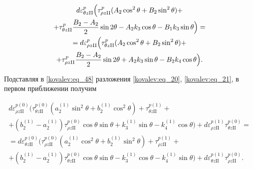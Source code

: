  \begin{multline}

\label{kovalev:eq_48}

 d\varepsilon_{\theta z\mathrm{II}}^p

 \Bigl(\tau_{\rho z\mathrm{II}}^p (A_2\cos^2\theta+B_2\sin^2\theta )+ \\

 +\tau_{\theta z\mathrm{II}}^p\frac{B_2-A_2}{2}\sin2\theta-A_2k_3\cos\theta-B_1k_3\sin\theta\Bigr)=\\

=d\varepsilon_{\rho z\mathrm{II}}^p \Bigl(\tau_{\theta z\mathrm{II}}^p (A_2\cos^2\theta+B_2\sin^2\theta)+\\

 +\tau_{\rho z\mathrm{II}}^p\frac{B_2-A_2}{2}\sin2\theta+A_2k_3\sin\theta-B_2k_4\cos\theta\Bigr).

 \end{multline}

Подставляя в \eqref{kovalev:eq_48} разложения \eqref{kovalev:eq_20}, \eqref{kovalev:eq_21}, в первом приближении получим

 \begin{multline}

\label{kovalev:eq_49}

  d\varepsilon_{\rho z\mathrm{II}}^{p(0)}

  \bigl(\tau_{\theta z\mathrm{II}}^{p(0)}

  (a_2^{(1)}\sin^2\theta+b_2^{(1)}\cos^2\theta )+\tau_{\theta z\mathrm{II}}^{p(1)}+ \\

  +(b_2^{(1)}-a_2^{(1)})\tau_{\rho z\mathrm{II}}^{p(0)}\cos\theta\sin\theta+k_3^{(1)}\sin\theta-k_4^{(1)}\cos\theta\bigr)+

  d\varepsilon_{\rho z\mathrm{II}}^{p(1)}\tau_{\theta z\mathrm{II}}^{p(0)}=\\

  =d\varepsilon_{\theta z\mathrm{II}}^{p(0)}\bigl(\tau_{\rho z\mathrm{II}}^{p(0)}

  (a_2^{(1)}\cos^2\theta+b_2^{(1)}\sin^2\theta)+\tau_{\rho z\mathrm{II}}^{p(1)}+ \\

  +(b_2^{(1)}-a_2^{(1)})\tau_{\theta z\mathrm{II}}^{p(0)}\cos\theta\sin\theta-k_3^{(1)}\cos\theta-k_4^{(1)}\sin\theta\bigr)+

  d\varepsilon_{\theta z\mathrm{II}}^{p(1)}\tau_{\rho z\mathrm{II}}^{p(0)}.

 \end{multline}



